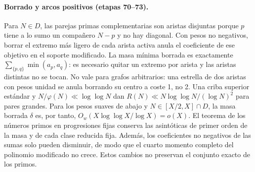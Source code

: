 \documentclass[11pt,a4paper]{article}
\newcommand{\B}[2]{#2}
\newcommand{\B}[2]{#1}
\begin{document}
\paragraph{\B{Deletion and positive arcs (stages 70--73).}{Borrado y arcos positivos (etapas 70--73).}}
\B{For $N\in D$, complementary prime pairs form a matching because $p$ has at most one partner $N-p$ and there is no diagonal. With nonnegative weights, deleting the lighter endpoint of each active edge annihilates that target coefficient in the modified support. The exact minimum deleted mass is $\sum_{\{p,q\}}\min(a_p,a_q)$: one endpoint per edge is necessary and different edges are disjoint. This is not valid on arbitrary graphs: a two-edge star with unit weights is erased by deleting its center at cost 1, not 2. Using a standard upper-bound sieve \cite{ford,wu} and $N/\varphi(N)\ll\log\log N$ gives $R(N)\ll N\log\log N/(\log N)^2$ for large even $N$. For the smooth prime weights below and $N\in[X/2,X]\cap D$, the removed mass $\delta$ is therefore $O_w(X\log\log X/\log X)=o(X)$. The retained first-order total and fixed reduced-class asymptotics follow from the prime number theorem in fixed progressions. Also, nonnegative sum coefficients can only decrease, so the full fourth moment of the modified sum cannot increase. These changes do not preserve the exact set of primes.}{Para $N\in D$, las parejas primas complementarias son aristas disjuntas porque $p$ tiene a lo sumo un compañero $N-p$ y no hay diagonal. Con pesos no negativos, borrar el extremo más ligero de cada arista activa anula el coeficiente de ese objetivo en el soporte modificado. La masa mínima borrada es exactamente $\sum_{\{p,q\}}\min(a_p,a_q)$: es necesario quitar un extremo por arista y las aristas distintas no se tocan. No vale para grafos arbitrarios: una estrella de dos aristas con pesos unidad se anula borrando su centro a coste 1, no 2. Una criba superior estándar \cite{ford,wu} y $N/\varphi(N)\ll\log\log N$ dan $R(N)\ll N\log\log N/(\log N)^2$ para pares grandes. Para los pesos suaves de abajo y $N\in[X/2,X]\cap D$, la masa borrada $\delta$ es, por tanto, $O_w(X\log\log X/\log X)=o(X)$. El teorema de los números primos en progresiones fijas conserva las asintóticas de primer orden de la masa y de cada clase reducida fija. Además, los coeficientes no negativos de las sumas solo pueden disminuir, de modo que el cuarto momento completo del polinomio modificado no crece. Estos cambios no preservan el conjunto exacto de los primos.}
\end{document}
